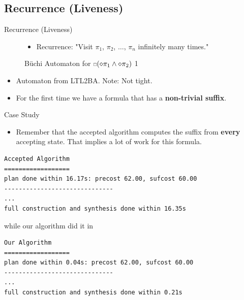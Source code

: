 \documentclass{beamer}
\newcommand{\ssquare}{\text{\scalebox{0.6}{$\square$}}}
\begin{document}
\subsection{Recurrence (Liveness)}
\begin{frame}{Recurrence (Liveness)}
\begin{figure}
\centering
\begin{itemize}
\item Recurrence: "Visit $\pi_1$, $\pi_2$, $\dots$, $\pi_n$ infinitely many times."
\end{itemize}
\caption{B\"uchi Automaton for $\ssquare(\diamond \pi_1 \land \diamond \pi_2 )$ 1}
\label{fig:gasBuchiRec}
\end{figure}
\begin{itemize}
\item \small Automaton from LTL2BA. Note: Not tight.
\pause
\item For the first time we have a formula that has a \textbf{non-trivial suffix}.
\end{itemize}
\end{frame}

\begin{frame}[fragile]{Case Study}
\begin{itemize}
\item Remember that the accepted algorithm computes the suffix from \textbf{every} accepting state. That implies a lot of work for this formula.
\end{itemize}
\pause
\begingroup
\fontsize{9pt}{12pt}\selectfont
\begin{lstlisting}
Accepted Algorithm
==================
plan done within 16.17s: precost 62.00, sufcost 60.00
------------------------------
...
full construction and synthesis done within 16.35s 
\end{lstlisting}
\endgroup
while our algorithm did it in
\begingroup
\fontsize{9pt}{12pt}\selectfont
\begin{lstlisting}
Our Algorithm
==================
plan done within 0.04s: precost 62.00, sufcost 60.00
------------------------------
...
full construction and synthesis done within 0.21s 
\end{lstlisting}
\endgroup
\end{frame}
\end{document}
